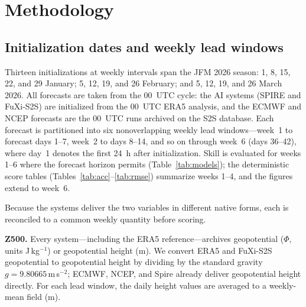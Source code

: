 \documentclass[11pt,a4paper]{article}
\begin{document}
\section{Methodology}\label{sec:method}

\subsection{Initialization dates and weekly lead windows}\label{sec:weeks}

Thirteen initializations at weekly intervals span the JFM 2026 season:
1, 8, 15, 22, and 29 January; 5, 12, 19, and 26 February; and 5, 12,
19, and 26 March 2026. All forecasts are taken from the 00~UTC cycle:
the AI systems (SPIRE and FuXi-S2S) are initialized from the 00~UTC ERA5
analysis, and the ECMWF and NCEP forecasts are the 00~UTC runs archived
on the S2S database. Each forecast is partitioned into six nonoverlapping
weekly lead windows---week~1 to forecast days 1--7, week~2 to days 8--14,
and so on through week~6 (days 36--42), where day~1 denotes the first
24~h after initialization. Skill is evaluated for weeks 1--6 where the
forecast horizon permits (Table~\ref{tab:models}); the deterministic
score tables (Tables~\ref{tab:acc}--\ref{tab:rmse}) summarize weeks 1--4,
and the figures extend to week~6.

Because the systems deliver the two variables in different native forms,
each is reconciled to a common weekly quantity before scoring.

\textbf{Z500.}
Every system---including the ERA5 reference---archives geopotential
($\Phi$, units J\,kg$^{-1}$) or geopotential height (m). We convert
ERA5 and FuXi-S2S geopotential to geopotential height by dividing by
the standard gravity $g = 9.80665$\,m\,s$^{-2}$; ECMWF, NCEP, and
Spire already deliver geopotential height directly. For each lead window,
the daily height values are averaged to a weekly-mean field (m).
\end{document}
